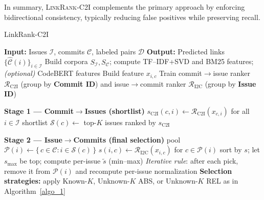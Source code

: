 In summary, \textsc{LinkRank-C2I} complements the primary approach by enforcing bidirectional consistency, typically reducing false positives while preserving recall.




\begin{algorithm}[htbp]
\caption{LinkRank-C2I}
\label{algo_2}
\begin{algorithmic}[1]
\STATE \textbf{Input:} Issues $\mathcal{I}$, commits $\mathcal{C}$, labeled pairs $\mathcal{D}$
\STATE \textbf{Output:} Predicted links $\{\widehat{\mathcal{C}}(i)\}_{i\in\mathcal{I}}$
\STATE Build corpora $S_{\mathcal{I}}, S_{\mathcal{C}}$; compute TF--IDF{+}SVD and BM25 features; \textit{(optional) }CodeBERT features
  \STATE Build feature $x_{i,c}$ 
\ENDFOR
\STATE Train commit$\rightarrow$issue ranker $\mathcal{R}_{\text{C2I}}$ (group by \textbf{Commit ID}) and issue$\rightarrow$commit ranker $\mathcal{R}_{\text{I2C}}$ (group by \textbf{Issue ID})

\vspace{0.25em}
\STATE \textbf{Stage 1 — Commit$\rightarrow$Issues (shortlist)}
  \STATE $s_{\text{C2I}}(c,i)\gets \mathcal{R}_{\text{C2I}}(x_{c,i})$ for all $i\in\mathcal{I}$
  \STATE shortlist $\mathcal{S}(c)\gets$ top-$K$ issues ranked by $s_{\text{C2I}}$
\ENDFOR

\vspace{0.25em}
\STATE \textbf{Stage 2 — Issue$\rightarrow$Commits (final selection)}
  \STATE pool $\mathcal{P}(i)\gets \{\,c\in\mathcal{C}: i\in\mathcal{S}(c)\,\}$
  \STATE $s(i,c)\gets \mathcal{R}_{\text{I2C}}(x_{i,c})$ for $c\in\mathcal{P}(i)$
  \STATE sort by $s$; let $s_{\max}$ be top; compute per-issue $\tilde{s}$ (min--max)
  \STATE \textit{Iterative rule}: after each pick, remove it from $\mathcal{P}(i)$ and recompute per-issue normalization
  \STATE \textbf{Selection strategies:} apply Known-$K$, Unknown-$K$ ABS, or Unknown-$K$ REL as in Algorithm~\ref{algo_1}
\ENDFOR
\end{algorithmic}
\end{algorithm}